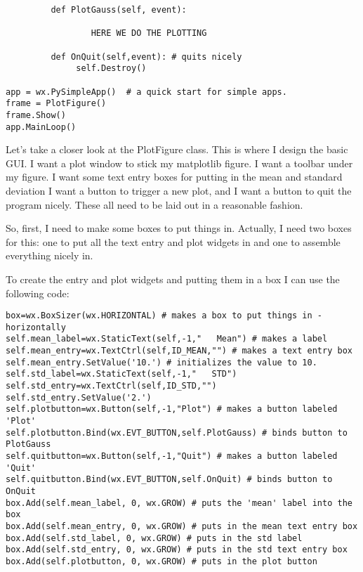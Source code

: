 {{\begin{verbatim}
         def PlotGauss(self, event):
              
                 HERE WE DO THE PLOTTING
                 
         def OnQuit(self,event): # quits nicely
              self.Destroy()      
              
app = wx.PySimpleApp()  # a quick start for simple apps.  
frame = PlotFigure()  
frame.Show()
app.MainLoop()
\end{verbatim}}



Let's take a closer look at the {\color{blue}PlotFigure} class.     This is where I design the basic GUI. 
 I want a plot window to stick my matplotlib figure. I want a toolbar under my figure.
 I want some text entry boxes for putting in the mean and standard deviation
 I want a button to trigger a new plot,  and I want a button to quit the program nicely.
 These all need to be laid out in a reasonable fashion.  
 
 So, first, I need to make some boxes to put things in.   Actually, I need two boxes for this:
 one to put all the text entry and plot widgets in
 and one to assemble everything nicely in.

To create the entry and plot widgets and putting them in a box I can use the following code: 

{\singlespacing \color{blue} \begin{verbatim}
box=wx.BoxSizer(wx.HORIZONTAL) # makes a box to put things in - horizontally
self.mean_label=wx.StaticText(self,-1,"   Mean") # makes a label
self.mean_entry=wx.TextCtrl(self,ID_MEAN,"") # makes a text entry box
self.mean_entry.SetValue('10.') # initializes the value to 10.
self.std_label=wx.StaticText(self,-1,"   STD") 
self.std_entry=wx.TextCtrl(self,ID_STD,"")
self.std_entry.SetValue('2.')
self.plotbutton=wx.Button(self,-1,"Plot") # makes a button labeled 'Plot'
self.plotbutton.Bind(wx.EVT_BUTTON,self.PlotGauss) # binds button to PlotGauss
self.quitbutton=wx.Button(self,-1,"Quit") # makes a button labeled 'Quit'
self.quitbutton.Bind(wx.EVT_BUTTON,self.OnQuit) # binds button to OnQuit 
box.Add(self.mean_label, 0, wx.GROW) # puts the 'mean' label into the box
box.Add(self.mean_entry, 0, wx.GROW) # puts in the mean text entry box
box.Add(self.std_label, 0, wx.GROW) # puts in the std label
box.Add(self.std_entry, 0, wx.GROW) # puts in the std text entry box
box.Add(self.plotbutton, 0, wx.GROW) # puts in the plot button
\end{verbatim}
}

}
